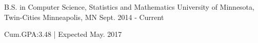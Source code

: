 

\begin{cventries}

  \cventry
    {B.S. in Computer Science, Statistics and Mathematics} %
    {University of Minnesota, Twin-Cities} %
    {Minneapolis, MN} %
    {Sept. 2014 - Current} %
    {
      \begin{cvitems} %
         \item {Cum.GPA:3.48 {\enskip|\enskip} Expected May. 2017}
      \end{cvitems}
    }

\end{cventries}
